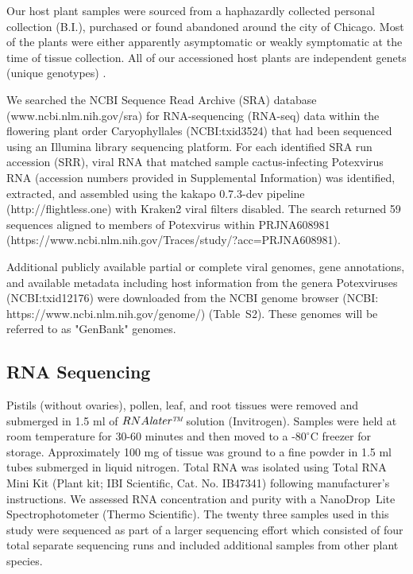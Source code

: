 \documentclass[fleqn,10pt,lineno]{wlpeerj}
\begin{document}
Our host plant samples were sourced from a haphazardly collected personal collection (B.I.), purchased or found abandoned around the city of Chicago. 
Most of the plants were either apparently asymptomatic or weakly symptomatic at the time of tissue collection.
All of our accessioned host plants are independent genets (unique genotypes) \citep{ramanauskas2021}.


We searched the NCBI Sequence Read Archive (SRA) database (www.ncbi.nlm.nih.gov/sra) for RNA-sequencing (RNA-seq) data within the flowering plant order Caryophyllales (NCBI:txid3524) that had been sequenced using an Illumina library sequencing platform. 
For each identified SRA run accession (SRR), viral RNA that matched sample cactus-infecting Potexvirus RNA (accession numbers provided in Supplemental Information) was identified, extracted, and assembled using the kakapo 0.7.3-dev pipeline (http://flightless.one) with Kraken2 viral filters disabled. 
The search returned 59 sequences aligned to members of Potexvirus within PRJNA608981 (https://www.ncbi.nlm.nih.gov/Traces/study/?acc=PRJNA608981).


Additional publicly available partial or complete viral genomes, gene annotations, and available metadata including host information from the genera Potexviruses (NCBI:txid12176) were downloaded from the NCBI genome browser (NCBI: https://www.ncbi.nlm.nih.gov/genome/) (Table~S2).
These genomes will be referred to as "GenBank" genomes.

\subsection*{RNA Sequencing}


Pistils (without ovaries), pollen, leaf, and root tissues were removed and submerged in 1.5 ml of $RNA\textit{later\texttrademark}$ solution (Invitrogen).
Samples were held at room temperature for 30-60 minutes and then moved to a -$80^{\circ}$C freezer for storage.
Approximately 100 mg of tissue was ground to a fine powder in 1.5 ml tubes submerged in liquid nitrogen.
Total RNA was isolated using Total RNA Mini Kit (Plant kit; IBI Scientific, Cat. No. IB47341) following manufacturer's instructions.
We assessed RNA concentration and purity with a NanoDrop\texttrademark~Lite Spectrophotometer (Thermo Scientific).
The twenty three samples used in this study were sequenced as part of a larger sequencing effort which consisted of four total separate sequencing runs and included additional samples from other plant species. 
\end{document}
